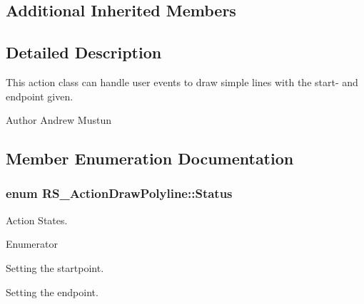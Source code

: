 \subsection*{Additional Inherited Members}


\subsection{Detailed Description}
This action class can handle user events to draw simple lines with the start-\/ and endpoint given.

\begin{DoxyAuthor}{Author}
Andrew Mustun 
\end{DoxyAuthor}


\subsection{Member Enumeration Documentation}
\hypertarget{classRS__ActionDrawPolyline_a40edf125038897bf04b036913d22594f}{
\subsubsection[{Status}]{\setlength{\rightskip}{0pt plus 5cm}enum {\bf R\-S\-\_\-\-Action\-Draw\-Polyline\-::\-Status}}}\label{classRS__ActionDrawPolyline_a40edf125038897bf04b036913d22594f}
Action States. \begin{Desc}
\item[Enumerator]\par
\begin{description}
\item[{\em 
\hypertarget{classRS__ActionDrawPolyline_a40edf125038897bf04b036913d22594fa022ceb9ae1dcadfb72f0f4a8a679d692}{Set\-Startpoint}\label{classRS__ActionDrawPolyline_a40edf125038897bf04b036913d22594fa022ceb9ae1dcadfb72f0f4a8a679d692}
}]Setting the startpoint. \item[{\em 
\hypertarget{classRS__ActionDrawPolyline_a40edf125038897bf04b036913d22594fa73539a92360435367f88211036cf26e1}{Set\-Next\-Point}\label{classRS__ActionDrawPolyline_a40edf125038897bf04b036913d22594fa73539a92360435367f88211036cf26e1}
}]Setting the endpoint. \end{description}
\end{Desc}


